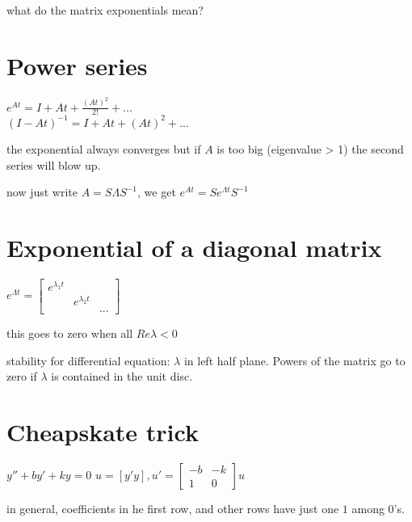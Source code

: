 \documentclass{article}
\begin{document}
what do the matrix exponentials mean?

\section{Power series}

$e^{At} = I + At + \frac{(At)^2}{2!} + ...$ \\
$(I-At)^{-1} = I + At + (At)^2 + ...$

the exponential always converges but if $A$ is too big (eigenvalue > 1) the second series will blow up.

now just write $A = S\Lambda S^{-1}$, we get $e^{At} = S e^{\Lambda t} S^{-1}$

\section{Exponential of a diagonal matrix}

$e^{\Lambda t} = \begin{bmatrix}
e^{\lambda_1 t} \\
& e^{\lambda_2 t} \\
& & ...
\end{bmatrix}$

this goes to zero when all $Re \lambda < 0$

stability for differential equation: $\lambda$ in left half plane. Powers of the matrix go to zero if $\lambda$ is contained in the unit disc.

\section{Cheapskate trick}

$y'' + by' + ky = 0$
$u = [y' y], u' = \begin{bmatrix}
-b & -k \\
1 & 0
\end{bmatrix} u$

in general, coefficients in he first row, and other rows have just one $1$ among $0$'s.
\end{document}
